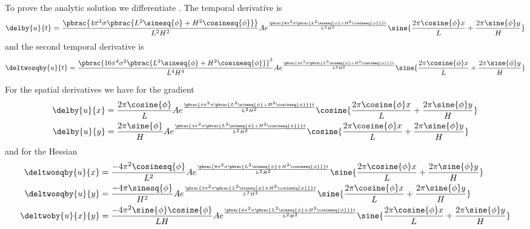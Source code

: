 To prove the analytic solution we differentiate
. The temporal derivative is
\begin{equation}
  \delby{u}{t} = \frac{\pbrac{4\pi^{2}\sigma\pbrac{L^{2}\sinesq{\phi}+H^{2}\cosinesq{\phi}}}}{L^{2}H^{2}}
  Ae^{\frac{\pbrac{4\pi^{2}\sigma\pbrac{L^{2}\sinesq{\phi}+H^{2}\cosinesq{\phi}}}t}{L^{2}H^{2}}}
  \sine{\dfrac{2\pi\cosine{\phi}x}{L}+\dfrac{2\pi\sine{\phi}y}{H}}
  \label{eqn:AnalyticDiffusionEquationTwoDim1Velocity}
\end{equation}
and the second temporal derivative is
\begin{equation}
  \deltwosqby{u}{t} = \frac{\pbrac{16\pi^{4}\sigma^{2}\pbrac{L^{2}\sinesq{\phi}+H^{2}\cosinesq{\phi}}}^{2}}{L^{4}H^{4}}
  Ae^{\frac{\pbrac{4\pi^{2}\sigma\pbrac{L^{2}\sinesq{\phi}+H^{2}\cosinesq{\phi}}}t}{L^{2}H^{2}}}
  \sine{\dfrac{2\pi\cosine{\phi}x}{L}+\dfrac{2\pi\sine{\phi}y}{H}}
  \label{eqn:AnalyticDiffusionEquationTwoDim1Acceleration}
\end{equation}

For the spatial derivatives we have for the gradient
\begin{equation}
  \begin{aligned}
    \delby{u}{x}&=\dfrac{2\pi\cosine{\phi}}{L}Ae^{\frac{\pbrac{4\pi^{2}\sigma\pbrac{L^{2}\sinesq{\phi}+H^{2}\cosinesq{\phi}}}t}{L^{2}H^{2}}}
    \cosine{\dfrac{2\pi\cosine{\phi}x}{L}+\dfrac{2\pi\sine{\phi}y}{H}} \\
    \delby{u}{y}&=\dfrac{2\pi\sine{\phi}}{H}Ae^{\frac{\pbrac{4\pi^{2}\sigma\pbrac{L^{2}\sinesq{\phi}+H^{2}\cosinesq{\phi}}}t}{L^{2}H^{2}}}
    \cosine{\dfrac{2\pi\cosine{\phi}x}{L}+\dfrac{2\pi\sine{\phi}y}{H}}
  \end{aligned}
  \label{eqn:AnalyticDiffusionEquationTwoDim1Gradient}
\end{equation}
and for the Hessian
\begin{equation}
  \begin{aligned}
    \deltwosqby{u}{x} &= \dfrac{-4\pi^{2}\cosinesq{\phi}}{L^{2}}Ae^{\frac{\pbrac{4\pi^{2}\sigma\pbrac{L^{2}\sinesq{\phi}+H^{2}\cosinesq{\phi}}}t}{L^{2}H^{2}}}
    \sine{\dfrac{2\pi\cosine{\phi}x}{L}+\dfrac{2\pi\sine{\phi}y}{H}} \\
    \deltwosqby{u}{y}&=\dfrac{-4\pi\sinesq{\phi}}{H^{2}}Ae^{\frac{\pbrac{4\pi^{2}\sigma\pbrac{L^{2}\sinesq{\phi}+H^{2}\cosinesq{\phi}}}t}{L^{2}H^{2}}}
    \sine{\dfrac{2\pi\cosine{\phi}x}{L}+\dfrac{2\pi\sine{\phi}y}{H}} \\
    \deltwoby{u}{x}{y} &= \dfrac{-4\pi^{2}\sine{\phi}\cosine{\phi}}{LH}Ae^{\frac{\pbrac{4\pi^{2}\sigma\pbrac{L^{2}\sinesq{\phi}+H^{2}\cosinesq{\phi}}}t}{L^{2}H^{2}}}
    \sine{\dfrac{2\pi\cosine{\phi}x}{L}+\dfrac{2\pi\sine{\phi}y}{H}}
  \end{aligned}
  \label{eqn:AnalyticDiffusionEquationTwoDim1Hessian}
\end{equation}

